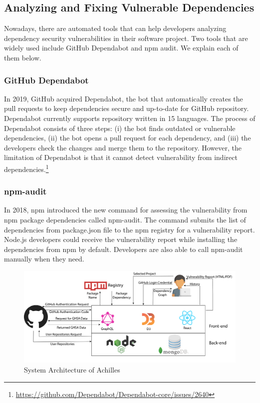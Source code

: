 \documentclass[conference]{IEEEtran}
\begin{document}
	\subsection{Analyzing and Fixing Vulnerable Dependencies}
	    Nowadays, there are automated tools that can help developers analyzing dependency security vulnerabilities in their software project. Two tools that are widely used include GitHub Dependabot and npm audit. We explain each of them below.
		
	\subsubsection{GitHub Dependabot}
	In 2019, GitHub acquired Dependabot, the bot that automatically creates the pull requests to keep dependencies secure and up-to-date for GitHub repository.
	Dependabot currently supports repository written in 15 languages.
	The process of Dependabot consists of three steps: (i) the bot finds outdated or vulnerable dependencies, (ii) the bot opens a pull request for each dependency, and (iii) the developers check the changes and merge them to the repository.
	However, the limitation of Dependabot is that it cannot detect vulnerability from indirect dependencies.\footnote{\url{https://github.com/Dependabot/Dependabot-core/issues/2640}}
	\subsubsection{npm-audit}
	In 2018, npm introduced the new command for assessing the vulnerability from npm package dependencies called npm-audit.
	The command submits the list of dependencies from package.json file to the npm registry for a vulnerability report.
	Node.js developers could receive the vulnerability report while installing the dependencies from npm by default.
	Developers are also able to call npm-audit manually when they need.
	
	\begin{figure}[tb]
		\centering
		\includegraphics[width=1.2\columnwidth]{Figures/SystemArch.png}
		\caption{System Architecture of Achilles}
		\label{fig:system_architecture}
	\end{figure}
	
\end{document}
